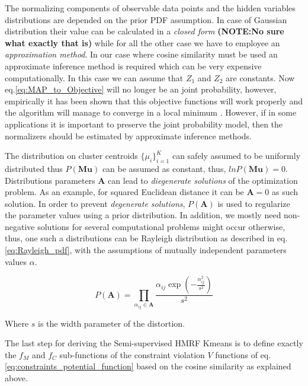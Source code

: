 \documentclass[dvips,dvipdfm,pdftex]{llncs}
\begin{document}
The normalizing components of observable data points and the hidden variables distributions are depended on the prior PDF assumption. In case of Gaussian distribution their value can be calculated in a \emph{closed form} \textbf{(NOTE:No sure what exactly that is)} while for all the other case we have to employee an \emph{approximation method}. In our case where cosine similarity must be used an approximate inference method is required which can be very expensive computationally. In this case we can assume that $Z_{1}$ and $Z_{2}$ are constants. Now eq.\ref{eq:MAP_to_Objective} will no longer be an joint probability, however, empirically it has been shown that this objective functions will work properly and the algorithm will manage to converge in a local minimum \cite{basu2004probabilistic}. However, if in some applications it is important to preserve the joint probability model, then the normalizers should be estimated by approximate inference methods.

The distribution on cluster centroids $\{\mu_{i}\}_{i=1}^{K}$ can safely assumed to be uniformly distributed thus $P(\mathbf{Mu})$ can be assumed as constant, thus, $lnP(\mathbf{Mu})=0$. Distributions parameters $\mathbf{A}$ can lead to \emph{diegenerate solutions} of the optimization problem. As an example, for squared Euclidean distance it can be $\mathbf{A}=0$ as such solution. In order to prevent \emph{degenerate solutions}, $P(\mathbf{A})$ is used to regularize the parameter values using a prior distribution. In addition, we mostly need non-negative solutions for several computational problems might occur otherwise, thus, one such a distributions can be Rayleigh distribution as described in eq.\ref{eq:Rayleigh_pdf}, with the assumptions of mutually independent parameters values $\alpha$.

\begin{equation}
	P(\mathbf{A})=\prod_{\alpha_{ij}\in\mathbf{A}}\frac{\alpha_{ij}\exp(-\frac{\alpha_{ij}^{2}}{s^{2}})}{s^{2}}
\label{eq:Rayleigh_pdf}
\end{equation}

Where $s$ is the width parameter of the distortion.

The last step for deriving the Semi-supervised HMRF Kmeans is to define exactly the $f_{M}$ and $f_{C}$ sub-functions of the constraint violation $V$ functions of eq.\ref{eq:constraints_potential_function} based on the cosine similarity as explained above.
\end{document}
